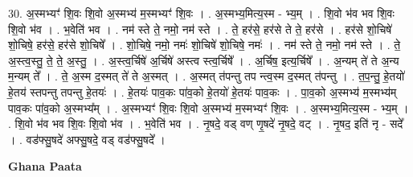 \documentclass[17pt]{extarticle}
\begin{document}
30. अ॒स्मभ्यꣳ॑ शि॒वः शि॒वो अ॒स्मभ्य॑ म॒स्मभ्यꣳ॑ शि॒वः । . अ॒स्मभ्य॒मित्य॒स्म - भ्य॒म् । . शि॒वो भ॑व भव शि॒वः शि॒वो भ॑व । . भ॒वेति॑ भव । . नम॑ स्ते ते॒ नमो॒ नम॑ स्ते । . ते॒ हर॑से॒ हर॑से ते ते॒ हर॑से । . हर॑से शो॒चिषे॑ शो॒चिषे॒ हर॑से॒ हर॑से शो॒चिषे᳚ । . शो॒चिषे॒ नमो॒ नमः॑ शो॒चिषे॑ शो॒चिषे॒ नमः॑ । . नम॑ स्ते ते॒ नमो॒ नम॑ स्ते । . ते॒ अ॒स्त्व॒स्तु॒ ते॒ ते॒ अ॒स्तु॒ । . अ॒स्त्व॒र्चिषे॑ अ॒र्चिषे॑ अस्त्व स्त्व॒र्चिषे᳚ । . अ॒र्चिष॒ इत्य॒र्चिषे᳚ । . अ॒न्यम् ते॑ ते अ॒न्य म॒न्यम् ते᳚ । . ते॒ अ॒स्म द॒स्मत् ते॑ ते अ॒स्मत् । . अ॒स्मत् त॑पन्तु तप न्त्व॒स्म द॒स्मत् त॑पन्तु । . त॒प॒न्तु॒ हे॒तयो॑ हे॒तय॑ स्तपन्तु तपन्तु हे॒तयः॑ । . हे॒तयः॑ पाव॒कः पा॑व॒को हे॒तयो॑ हे॒तयः॑ पाव॒कः । . पा॒व॒को अ॒स्मभ्य॑ म॒स्मभ्य॑म् पाव॒कः पा॑व॒को अ॒स्मभ्य᳚म् । . अ॒स्मभ्यꣳ॑ शि॒वः शि॒वो अ॒स्मभ्य॑ म॒स्मभ्यꣳ॑ शि॒वः । . अ॒स्मभ्य॒मित्य॒स्म - भ्य॒म् । . शि॒वो भ॑व भव शि॒वः शि॒वो भ॑व । . भ॒वेति॑ भव । . नृ॒षदे॒ वड् वण् णृ॒षदे॑ नृ॒षदे॒ वट् । . नृ॒षद॒ इति॑ नृ - सदे᳚ । . वड॑फ्सु॒षदे॑ अफ्सु॒षदे॒ वड् वड॑फ्सु॒षदे᳚ । \newline

\textbf{Ghana Paata } \newline
\end{document}
